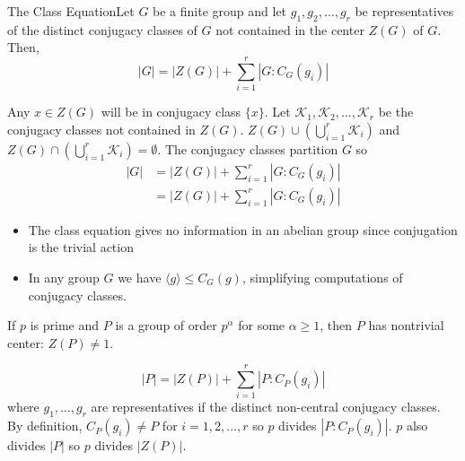 \documentclass{report}
\newcommand{\thm}[2]{\begin{Theorem}{#1}{}#2\end{Theorem}}
\newcommand{\ex}[2]{\begin{Example}{#1}{}#2\end{Example}}
\newenvironment{myproof}[1][\proofname]{%
	\proof[\bfseries #1: ]%
}{\endproof}
\newcommand{\mcK}{\mathcal{K}}	\newcommand{\mcL}{\mathcal{L}}
\begin{document}
\thm{The Class Equation}{Let $G$ be a finite group and let $g_1 , g_2 , \dots , g_r$ be representatives of the distinct conjugacy classes of $G$ not contained in the center $Z(G)$ of $G$. Then, 
$$|G| = |Z(G)| + \sum_{i=1}^r |G: C_G(g_i) |$$}
\begin{myproof}
    Any $x \in Z(G)$ will be in conjugacy class $\{x\}$. Let $\mcK_1, \mcK_2, \dots , \mcK_r$ be the conjugacy classes not contained in $Z(G)$. $Z(G) \cup \left( \bigcup_{i=1}^r  \mcK_i\right)$ and $Z(G) \cap \left( \bigcup_{i=1}^r  \mcK_i\right) = \emptyset$. The conjugacy classes partition $G$ so
    \begin{align*}
        |G| &= |Z(G)| + \sum_{i=1}^r |G: C_G(g_i) |\\
        &=|Z(G)| + \sum_{i=1}^r |G: C_G(g_i) |
    \end{align*}
\end{myproof}
\ex{}{\begin{itemize}
    \item The class equation gives no information in an abelian group since conjugation is the trivial action
    \item In any group $G$ we have $\langle g \rangle \leq C_G(g)$, simplifying computations of conjugacy classes. 
\end{itemize}}
\thm{}{If $p$ is prime and $P$ is a group of order $p^\alpha$ for some $\alpha \geq 1$, then $P$ has nontrivial center: $Z(P) \neq 1$.}
\begin{myproof}
    $$|P| = |Z(P)| + \sum_{i=1}^r |P:C_P(g_i)|$$
    where $g_1, \dots , g_r$ are representatives if the distinct non-central conjugacy classes. By definition, $C_P(g_i) \neq P$ for $i = 1, 2, \dots, r$ so $p$ divides $|P:C_P(g_i)|$. $p$ also divides $|P|$ so $p$ divides $|Z(P)|$. 
\end{myproof}
\end{document}
